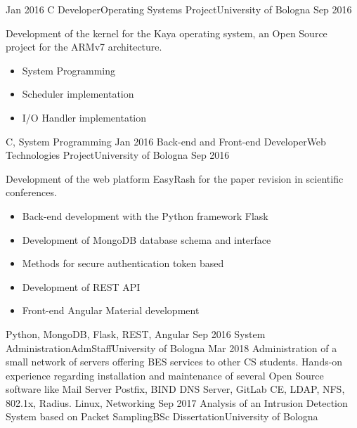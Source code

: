 \begin{experiences}
  \experience
    {Jan 2016}   {C Developer}{Operating Systems Project}{University of Bologna}
    {Sep 2016} {
                      Development of the kernel for the Kaya operating system, an Open Source project for the ARMv7 architecture.
                      \begin{itemize}
                        \item System Programming
                        \item Scheduler implementation
                        \item I/O Handler implementation
                      \end{itemize}
                    }
                    {C, System Programming}
  \emptySeparator
  \experience
    {Jan 2016}   {Back-end and Front-end Developer}{Web Technologies Project}{University of Bologna}
    {Sep 2016} {
                      Development of the web platform EasyRash for the paper revision in scientific conferences.
                      \begin{itemize}
                        \item Back-end development with the Python framework Flask
                        \item Development of MongoDB database schema and interface
                        \item Methods for secure authentication token based
                        \item Development of REST API
                        \item Front-end Angular Material development
                      \end{itemize}
                    }
                    {Python, MongoDB, Flask, REST, Angular}
  \emptySeparator
  \experience
    {Sep 2016}   {System Administration}{AdmStaff}{University of Bologna}
    {Mar 2018} {
                      Administration of a small network of servers offering BES services to other CS students. \linebreak
                      Hands-on experience regarding installation and maintenance of several Open Source software like Mail Server Postfix,
                      BIND DNS Server, GitLab CE, LDAP, NFS, 802.1x, Radius. 
                    }
                    {Linux, Networking}
  \emptySeparator
  \experience
    {Sep 2017}   {Analysis of an Intrusion Detection System based on Packet Sampling}{BSc Dissertation}{University of Bologna}

\end{experiences}
